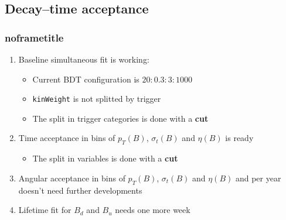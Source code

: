 \documentclass[aspectratio=43]{beamer}
\begin{document}
\subsection{Decay--time acceptance}



%
%
%



\begin{frame}[default] %
\frametitle{noframetitle}

\begin{enumerate}
  \item Baseline simultaneous fit is working:
  \begin{itemize}
    \item Current BDT configuration is $20:0.3:3:1000$
    \item \texttt{kinWeight} is not splitted by trigger
    \item The split in trigger categories is done with a \textbf{cut}
  \end{itemize}
  \item Time acceptance in bins of $p_T(B)$, $\sigma_t(B)$ and $\eta(B)$ is ready
  \begin{itemize}
    \item The split in variables is done with a \textbf{cut}
  \end{itemize}
  \item Angular acceptance in bins of $p_T(B)$, $\sigma_t(B)$ and $\eta(B)$ and per year doesn't need further developments
  \item Lifetime fit for $B_d$ and $B_u$ needs one more week

\end{enumerate}

\end{frame} %
\end{document}
